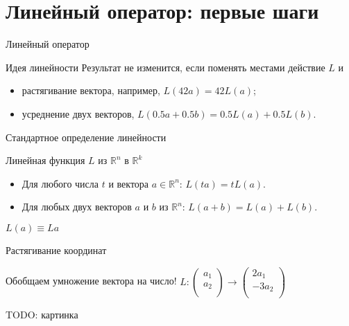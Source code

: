 \documentclass[14pt,xcolor=dvipsnames]{beamer}
\newcommand\R{\mathbb{R}}
\begin{document}
\section{Линейный оператор: первые шаги}


\begin{frame}{Линейный оператор}


\begin{block}{Идея линейности}
  Результат не изменится, если поменять местами действие $L$ и
  \begin{itemize}
    \item растягивание вектора, например, $L(42a)=42L(a)$;
    \item усреднение двух векторов, $L(0.5a+0.5b)=0.5L(a) + 0.5L(b)$.
  \end{itemize}
\end{block}

\end{frame}


\begin{frame}{Стандартное определение линейности}

\begin{block}{Линейная функция $L$ из $\R^n$ в $\R^k$}
\begin{itemize}
  \item Для любого числа $t$ и вектора $a \in \R^n$: $L(t a) = tL(a)$.
  \item Для любых двух векторов $a$ и $b$ из $\R^n$: $L(a + b) = L(a) + L(b)$.
\end{itemize}
\end{block}

\begin{block}{$L(a) \equiv La$}
\end{block}

\end{frame}


\begin{frame}{Растягивание координат}

\begin{block}{Обобщаем умножение вектора на число!}
  $L : \begin{pmatrix}
    a_1 \\
    a_2 \\
  \end{pmatrix} \to 
  \begin{pmatrix}
    2a_1 \\
    -3a_2 \\
  \end{pmatrix}$
\end{block}

\begin{block}{TODO: картинка}

\end{block}
\end{frame}
\end{document}

